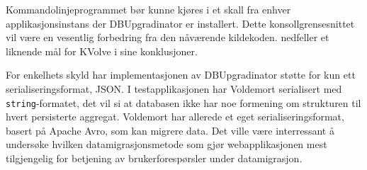 Kommandolinjeprogrammet bør kunne kjøres i et skall fra enhver applikasjonsinstans der DBUpgradinator er installert. Dette konsollgrensesnittet vil være en vesentlig forbedring fra den nåværende kildekoden. \cite{saur2016} nedfeller et liknende mål for KVolve i sine konklusjoner.

For enkelhets skyld har implementasjonen av DBUpgradinator støtte for kun ett serialiseringsformat, JSON. I testapplikasjonen har Voldemort serialisert med \texttt{string}-formatet, det vil si at databasen ikke har noe formening om strukturen til hvert persisterte aggregat. Voldemort har allerede et eget serialiseringsformat, basert på Apache Avro, som kan migrere data. Det ville være interressant å undersøke hvilken datamigrasjonsmetode som gjør webapplikasjonen mest tilgjengelig for betjening av brukerforespørsler under datamigrasjon.

\cleardoublepage


